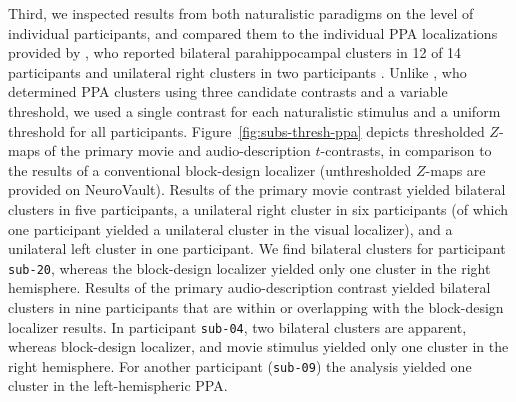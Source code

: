 \documentclass[english]{article}
\begin{document}

Third, we inspected results from both naturalistic paradigms on the level of
individual participants, and compared them to the individual PPA localizations
provided by \cite{sengupta2016extension}, who reported
bilateral parahippocampal clusters in 12 of 14 participants and unilateral right
clusters in two participants \citep[Tab.~3 in][]{sengupta2016extension}.
Unlike \cite{sengupta2016extension}, who determined PPA clusters using three
candidate contrasts and a variable threshold, we used a single contrast for each
naturalistic stimulus and a uniform threshold for all participants.
Figure~\ref{fig:subs-thresh-ppa} depicts thresholded $Z$-maps of the primary
movie and audio-description $t$-contrasts, in comparison to the results of a
conventional block-design localizer (unthresholded $Z$-maps are provided on
NeuroVault).
Results of the primary movie contrast yielded bilateral clusters in five
participants, a unilateral right cluster in six participants (of which one
participant yielded a unilateral cluster in the visual localizer), and a
unilateral left cluster in one participant.
We find bilateral clusters for participant \texttt{sub-20}, whereas the
block-design localizer yielded only one cluster in the right hemisphere.
Results of the primary audio-description contrast yielded bilateral clusters in
nine participants that are within or overlapping with the block-design localizer
results.
In participant \texttt{sub-04}, two bilateral clusters are apparent, whereas
block-design localizer, and movie stimulus yielded only one cluster in the right
hemisphere.
For another participant (\texttt{sub-09}) the analysis yielded one cluster in
the left-hemispheric PPA.
\end{document}
